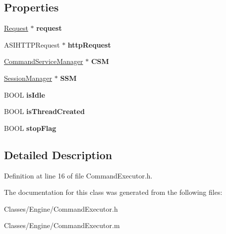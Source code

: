 \subsection*{Properties}
\begin{DoxyCompactItemize}
\item 
\hypertarget{interface_command_executor_a1c67eabe6dd40dd2f8892e10bc689979}{
\hyperlink{interface_request}{Request} $\ast$ {\bfseries request}}
\label{interface_command_executor_a1c67eabe6dd40dd2f8892e10bc689979}

\item 
\hypertarget{interface_command_executor_a574eaf2d62f44a450c427806515bf76b}{
ASIHTTPRequest $\ast$ {\bfseries httpRequest}}
\label{interface_command_executor_a574eaf2d62f44a450c427806515bf76b}

\item 
\hypertarget{interface_command_executor_aa6af9a18b48f90f2c2e38ea23f1d8499}{
\hyperlink{interface_command_service_manager}{CommandServiceManager} $\ast$ {\bfseries CSM}}
\label{interface_command_executor_aa6af9a18b48f90f2c2e38ea23f1d8499}

\item 
\hypertarget{interface_command_executor_a65017b57f549c5b4bb8e5e699367669b}{
\hyperlink{interface_session_manager}{SessionManager} $\ast$ {\bfseries SSM}}
\label{interface_command_executor_a65017b57f549c5b4bb8e5e699367669b}

\item 
\hypertarget{interface_command_executor_a91bbb925efdef20673245a84698f105d}{
BOOL {\bfseries isIdle}}
\label{interface_command_executor_a91bbb925efdef20673245a84698f105d}

\item 
\hypertarget{interface_command_executor_ac5976401fee9ebcfcb31dd13d8a3a146}{
BOOL {\bfseries isThreadCreated}}
\label{interface_command_executor_ac5976401fee9ebcfcb31dd13d8a3a146}

\item 
\hypertarget{interface_command_executor_a4001b3a25bcfe758876270db1c40dbf5}{
BOOL {\bfseries stopFlag}}
\label{interface_command_executor_a4001b3a25bcfe758876270db1c40dbf5}

\end{DoxyCompactItemize}


\subsection{Detailed Description}


Definition at line 16 of file CommandExecutor.h.



The documentation for this class was generated from the following files:\begin{DoxyCompactItemize}
\item 
Classes/Engine/CommandExecutor.h\item 
Classes/Engine/CommandExecutor.m\end{DoxyCompactItemize}
